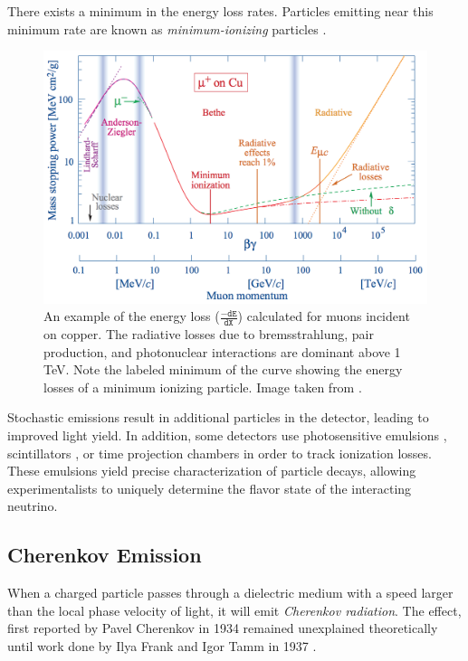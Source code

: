 There exists a minimum in the energy loss rates.
Particles emitting near this minimum rate are known as \emph{minimum-ionizing} particles \cite{PDG-2015}.

\begin{figure}
\centering
\includegraphics[width=0.8\linewidth]{bethe_bloche-PDG15.png}
\caption[Energy losses of a muon in matter]{An example of the energy loss ($\mathtt{\frac{-dE}{dX}}$) calculated for muons incident on copper. The radiative losses due to bremsstrahlung, pair production, and photonuclear interactions are dominant above 1 TeV. Note the labeled minimum of the curve showing the energy losses of a minimum ionizing particle. Image taken from \cite{PDG-2015}.}
\label{fig:discrete_emissions}
\end{figure}

Stochastic emissions result in additional particles in the detector, leading to improved light yield.
In addition, some detectors use photosensitive emulsions  \cite{Description-OPERA, DONUT-2001}, scintillators \cite{Description-MINOS, Description-NOvA, Description-MINERvA, Description-T2K}, or time projection chambers \cite{Description-ICARUS2} in order to track ionization losses.
These emulsions yield precise characterization of particle decays, allowing experimentalists to uniquely determine the flavor state of the interacting neutrino.

\subsection{Cherenkov Emission}
When a charged particle passes through a dielectric medium with a speed larger than the local phase velocity of light, it will emit \emph{Cherenkov radiation}\cite{Cherenkov-Radiation-Confirmation}.
The effect, first reported by Pavel Cherenkov in 1934 \cite{Cherenkov-Radiation-Observation} remained unexplained theoretically until work done by Ilya Frank and Igor Tamm in 1937 \cite{Frank-Tamm}.

